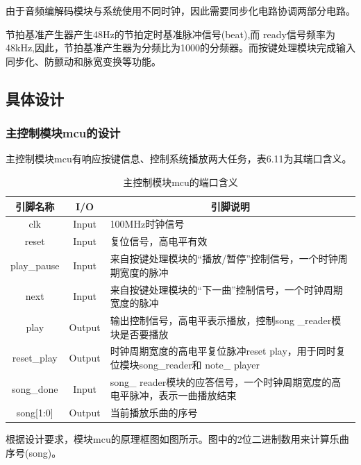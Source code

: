 \documentclass{../source/Experiment}
\begin{document}
        由于音频编解码模块与系统使用不同时钟，因此需要同步化电路协调两部分电路。
            
        节拍基准产生器产生48Hz的节拍定时基准脉冲信号(beat),而 ready信号频率为48kHz,因此，节拍基准产生器为分频比为1000的分频器。而按键处理模块完成输入同步化、防颤动和脉宽变换等功能。

        \subsection{具体设计}
            \subsubsection{主控制模块mcu的设计}

                主控制模块mcu有响应按键信息、控制系统播放两大任务，表6.11为其端口含义。

                \begin{table}[H]
                    \caption{主控制模块mcu的端口含义}
                    \begin{tabular}{|c|c|p{}|}
                        \hline
                        引脚名称          & I/O    & \multicolumn{1}{c|}{引脚说明}                                    \\ \hline
                        clk           & Input  & 100MHz时钟信号                                                   \\ \hline
                        reset         & Input  & 复位信号，高电平有效                                                   \\ \hline
                        play\_pause   & Input  & 来自按键处理模块的“播放/暂停”控制信号，一个时钟周期宽度的脉冲                             \\ \hline
                        next          & Input  & 来自按键处理模块的“下一曲”控制信号，一个时钟周期宽度的脉冲                               \\ \hline
                        play          & Output & 输出控制信号，高电平表示播放，控制song \_reader模块是否要播放                        \\ \hline
                        reset\_play   & Output & 时钟周期宽度的高电平复位脉冲reset play，用于同时复位模块song\_reader和 note\_ player \\ \hline
                        song\_done    & Input  & song\_ reader模块的应答信号，一个时钟周期宽度的高电平脉冲，表示一曲播放结束                 \\ \hline
                        song{[}1:0{]} & Output & 当前播放乐曲的序号                                                    \\ \hline
                    \end{tabular}
                \end{table}
                根据设计要求，模块mcu的原理框图如图所示。图中的2位二进制数用来计算乐曲序号(song)。
\end{document}
